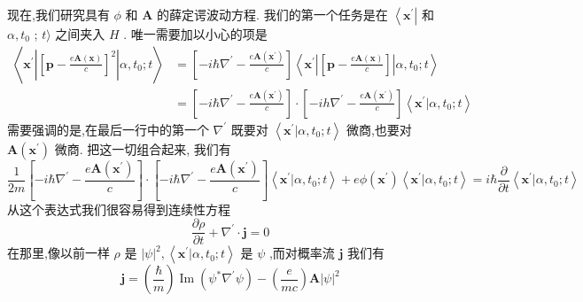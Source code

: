 现在,我们研究具有 $\phi$ 和 $\mathbf{A}$ 的薛定谔波动方程. 我们的第一个任务是在 $\left\langle {\mathbf{x}}^{\prime }\right|$ 和 $\alpha ,{t}_{0}$ ; $t\rangle$ 之间夹入 $H$ . 唯一需要加以小心的项是
\begin{equation}
\begin{aligned}
	\left\langle {{\mathbf{x}}^{\prime }\left| {\left\lbrack \mathbf{p} - \frac{e\mathbf{A}\left( \mathbf{x}\right) }{c}\right\rbrack }^{2}\right| \alpha ,{t}_{0};t}\right\rangle &= \left\lbrack {-i\hbar {\nabla }^{\prime } - \frac{e\mathbf{A}\left( {\mathbf{x}}^{\prime }\right) }{c}}\right\rbrack \left\langle {{\mathbf{x}}^{\prime }\left| \left\lbrack {\mathbf{p} - \frac{e\mathbf{A}\left( \mathbf{x}\right) }{c}}\right\rbrack \right| \alpha ,{t}_{0};t}\right\rangle\\
	&= \left\lbrack {-i\hbar {\nabla }^{\prime } - \frac{e\mathbf{A}\left( {\mathbf{x}}^{\prime }\right) }{c}}\right\rbrack \cdot \left\lbrack {-{ih}{\nabla }^{\prime } - \frac{e\mathbf{A}\left( {\mathbf{x}}^{\prime }\right) }{c}}\right\rbrack \left\langle {{\mathbf{x}}^{\prime } | \alpha ,{t}_{0};t}\right\rangle
\end{aligned}
\end{equation}
需要强调的是,在最后一行中的第一个 ${\nabla }^{\prime }$ 既要对 $\left\langle {{\mathbf{x}}^{\prime } | \alpha ,{t}_{0};t}\right\rangle$ 微商,也要对 $\mathbf{A}\left( {\mathbf{x}}^{\prime }\right)$ 微商. 把这一切组合起来, 我们有
\begin{equation}
\frac{1}{2m}\left\lbrack {-i\hbar {\nabla }^{\prime } - \frac{e\mathbf{A}\left( {\mathbf{x}}^{\prime }\right) }{c}}\right\rbrack \cdot \left\lbrack {-i\hbar {\nabla }^{\prime } - \frac{e\mathbf{A}\left( {\mathbf{x}}^{\prime }\right) }{c}}\right\rbrack \left\langle {{\mathbf{x}}^{\prime } | \alpha ,{t}_{0};t}\right\rangle+ {e\phi }\left( {\mathbf{x}}^{\prime }\right) \left\langle {{\mathbf{x}}^{\prime } | \alpha ,{t}_{0};t}\right\rangle = i\hbar \frac{\partial }{\partial t}\left\langle {{\mathbf{x}}^{\prime } | \alpha ,{t}_{0};t}\right\rangle
\end{equation}
从这个表达式我们很容易得到连续性方程
\begin{equation}
\frac{\partial \rho }{\partial t} + {\nabla }^{\prime } \cdot \mathbf{j} = 0
\end{equation}
在那里,像以前一样 $\rho$ 是 ${\left| \psi \right| }^{2},\left\langle {{\mathbf{x}}^{\prime } | \alpha ,{t}_{0};t}\right\rangle$ 是 $\psi$ ,而对概率流 $\mathbf{j}$ 我们有
\begin{equation}
\mathbf{j} = \left( \frac{\hbar }{m}\right) \operatorname{Im}\left( {{\psi }^{ * }{\nabla }^{\prime }\psi }\right) - \left( \frac{e}{mc}\right) \mathbf{A}{\left| \psi \right| }^{2}
\end{equation}
